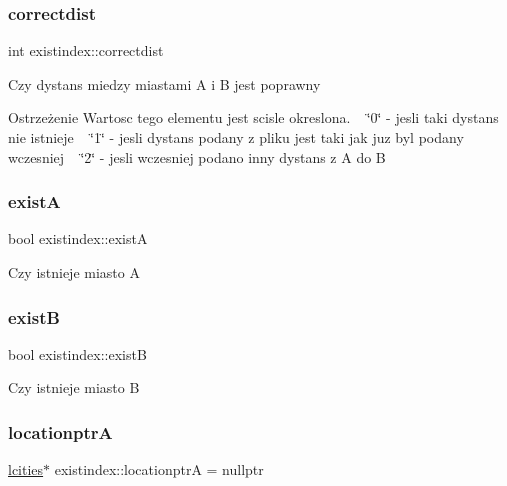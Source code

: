 \subsubsection{\texorpdfstring{correctdist}{correctdist}}
{\footnotesize\ttfamily int existindex\+::correctdist}

Czy dystans miedzy miastami A i B jest poprawny \begin{DoxyWarning}{Ostrzeżenie}
Wartosc tego elementu jest scisle okreslona. ~\newline
 \char`\"{}0\char`\"{} -\/ jesli taki dystans nie istnieje ~\newline
 \char`\"{}1\char`\"{} -\/ jesli dystans podany z pliku jest taki jak juz byl podany wczesniej ~\newline
 \char`\"{}2\char`\"{} -\/ jesli wczesniej podano inny dystans z A do B 
\end{DoxyWarning}
\mbox{\label{structexistindex_a0638291657c5a0cd38cc979e66bd58da}} 
\subsubsection{\texorpdfstring{existA}{existA}}
{\footnotesize\ttfamily bool existindex\+::existA}

Czy istnieje miasto A \mbox{\label{structexistindex_ab2d8d4d0afa56f1f1e131423674bbbf1}} 
\subsubsection{\texorpdfstring{existB}{existB}}
{\footnotesize\ttfamily bool existindex\+::existB}

Czy istnieje miasto B \mbox{\label{structexistindex_a78aac5475c8f83ee75289143aefa3d38}} 
\subsubsection{\texorpdfstring{locationptrA}{locationptrA}}
{\footnotesize\ttfamily \mbox{\hyperlink{structlcities}{lcities}}$\ast$ existindex\+::locationptrA = nullptr}

